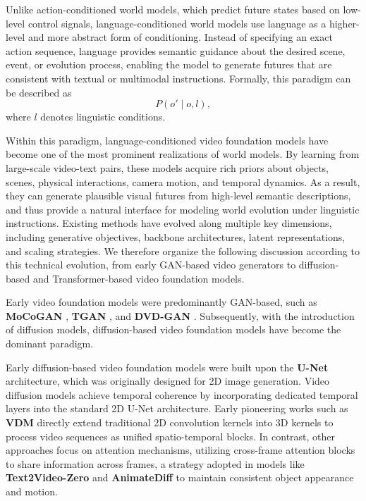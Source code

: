 Unlike action-conditioned world models, which predict future states based on low-level control signals, language-conditioned world models use language as a higher-level and more abstract form of conditioning. Instead of specifying an exact action sequence, language provides semantic guidance about the desired scene, event, or evolution process, enabling the model to generate futures that are consistent with textual or multimodal instructions. Formally, this paradigm can be described as
$$P\left(o' \mid o, l\right),$$
where $l$ denotes linguistic conditions. 


Within this paradigm, language-conditioned video foundation models have become one of the most prominent realizations of world models. By learning from large-scale video-text pairs, these models acquire rich priors about objects, scenes, physical interactions, camera motion, and temporal dynamics. As a result, they can generate plausible visual futures from high-level semantic descriptions, and thus provide a natural interface for modeling world evolution under linguistic instructions. Existing methods have evolved along multiple key dimensions, including generative objectives, backbone architectures, latent representations, and scaling strategies. We therefore organize the following discussion according to this technical evolution, from early GAN-based video generators to diffusion-based and Transformer-based video foundation models.

Early video foundation models were predominantly GAN-based, such as \textbf{MoCoGAN} \cite{MoCoGAN}, \textbf{TGAN} \cite{TGAN}, and \textbf{DVD-GAN} \cite{DVD-GAN}. Subsequently, with the introduction of diffusion models, diffusion-based video foundation models have become the dominant paradigm.  

Early diffusion-based video foundation models were built upon the \textbf{U-Net} \cite{UNet} architecture, which was originally designed for 2D image generation. Video diffusion models achieve temporal coherence by incorporating dedicated temporal layers into the standard 2D U-Net architecture. Early pioneering works such as \textbf{VDM} \cite{Video_Diffusion_Model} directly extend traditional 2D convolution kernels into 3D kernels to process video sequences as unified spatio-temporal blocks. In contrast, other approaches focus on attention mechanisms, utilizing cross-frame attention blocks to share information across frames, a strategy adopted in models like \textbf{Text2Video-Zero} \cite{Text2Video-Zero} and \textbf{AnimateDiff} \cite{AnimateDiff} to maintain consistent object appearance and motion.

